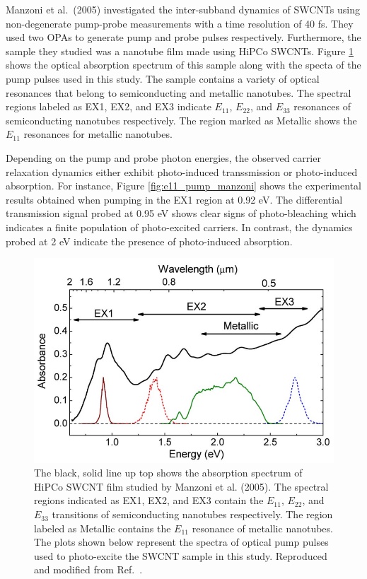 Manzoni et al.\ (2005) investigated the inter-subband dynamics of SWCNTs using non-degenerate pump-probe measurements with a time resolution of 40 fs. They used two OPAs to generate pump and probe pulses respectively. Furthermore, the sample they studied was a nanotube film made using HiPCo SWCNTs. Figure \ref{fig:abs_manzoni} shows the optical absorption spectrum of this sample along with the specta of the pump pulses used in this study. The sample contains a variety of optical resonances that belong to semiconducting and metallic nanotubes. The spectral regions labeled as EX1, EX2, and EX3 indicate $E_{11}$, $E_{22}$, and $E_{33}$ resonances of semiconducting nanotubes respectively. The region marked as Metallic shows the $E_{11}$ resonances for metallic nanotubes.

Depending on the pump and probe photon energies, the observed carrier relaxation dynamics either exhibit photo-induced transsmission or photo-induced absorption. For instance, Figure \ref{fig:e11_pump_manzoni} shows the experimental results obtained when pumping in the EX1 region at 0.92 eV. The differential transmission signal probed at 0.95 eV shows clear signs of photo-bleaching which indicates a finite population of photo-excited carriers. In contrast, the dynamics probed at 2 eV indicate the presence of photo-induced absorption.

\begin{figure}[H]
	\centering
	\includegraphics[scale=0.4]{images/chapter_prior_works/abs_manzoni}
	\caption{The black, solid line up top shows the absorption spectrum of HiPCo SWCNT film studied by Manzoni et al. (2005). The spectral regions indicated as EX1, EX2, and EX3 contain the $E_{11}$, $E_{22}$, and $E_{33}$ transitions of semiconducting nanotubes respectively. The region labeled as Metallic contains the $E_{11}$ resonance of metallic nanotubes. The plots shown below represent the spectra of optical pump pulses used to photo-excite the SWCNT sample in this study. Reproduced and modified from Ref.\ \cite{manzoni2005intersubband}.}
	\label{fig:abs_manzoni}
\end{figure}

